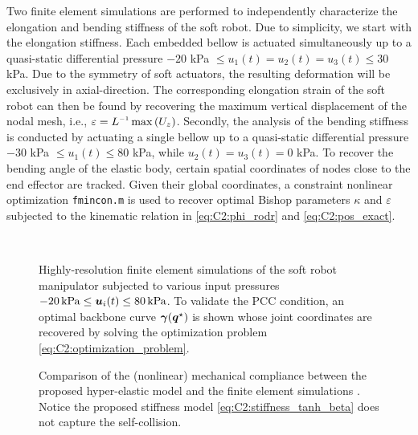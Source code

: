 Two finite element simulations are performed to {independently characterize the elongation and bending stiffness of the soft robot. Due to simplicity, we start with the elongation stiffness}. Each embedded bellow is actuated simultaneously up to a quasi-static differential pressure $-20$ kPa $\le u_1(t) = u_2(t) = u_3(t) \le 30$ kPa. Due to the symmetry of soft actuators, the resulting deformation will be exclusively in axial-direction. The corresponding elongation strain of the soft robot can then be found by recovering the maximum vertical displacement of the nodal mesh, i.e., $\varepsilon = L\inv\max \left( {U}_z \right)$. Secondly, the analysis of the bending stiffness is conducted by actuating a single bellow up to a quasi-static differential pressure $-30$ kPa $\le u_1(t) \le  80$ kPa, while $u_2(t) = u_3(t) = 0$ kPa. To recover the bending angle of the elastic body, certain spatial coordinates of nodes close to the end effector are tracked. Given their global coordinates, a constraint nonlinear optimization \texttt{fmincon.m} is used to recover optimal Bishop parameters $\kappa$ and $\varepsilon
$ subjected to the kinematic relation in \eqref{eq:C2:phi_rodr} and \eqref{eq:C2:pos_exact}.
%
\begin{figure}[!t]
  \centering
   \\[1em]
  
  \vspace{-0.2cm}
  \caption{Highly-resolution finite element simulations of the soft robot manipulator  subjected to various input pressures $-20 \,\si{\kilo \pascal} \le {\boldsymbol{u}}_i(t) \le 80 \,\si{\kilo \pascal}$. To validate the PCC condition, an optimal backbone curve ${\boldsymbol{\gamma}}({\boldsymbol{q}}^\star)$ is shown  whose joint coordinates are recovered by solving the optimization problem \eqref{eq:C2:optimization_problem}.}
  \vspace{-0.1cm}
  \label{fig:C2:fem_analysis}
\end{figure}
%
\begin{figure}[!t]
 \vspace{-1mm}
  \hspace{-2mm}
  
  \vspace{-0.5cm}
  \caption{Comparison of the (nonlinear) mechanical compliance between the proposed hyper-elastic model  and the finite element simulations . Notice the proposed stiffness model \eqref{eq:C2:stiffness_tanh_beta} does not capture the self-collision. }
  \vspace{-0.1cm}
  \label{fig:C2:fem_stress}
\end{figure}
